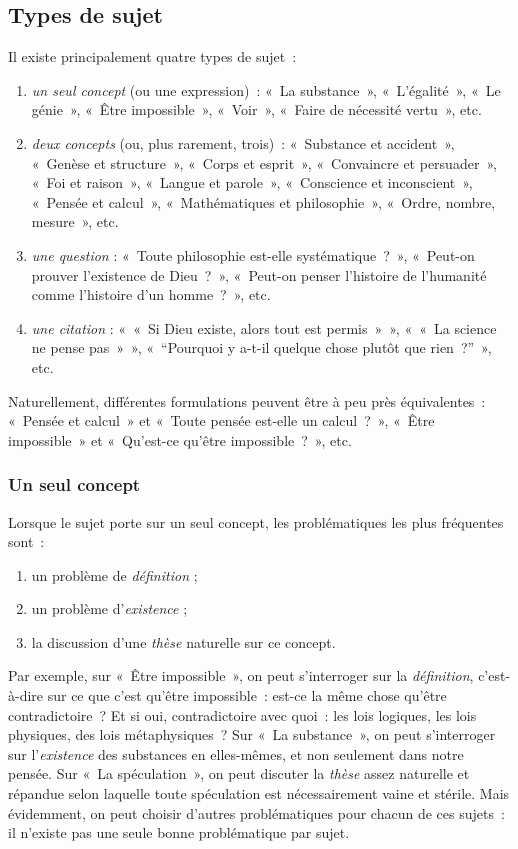 \documentclass[a4paper]{article}
\begin{document}
\subsection{Types de sujet}
\label{sec-2-3}


Il existe principalement quatre types de sujet :

\begin{enumerate}
\item \emph{un seul concept} (ou une expression) : « La substance », « L'égalité »,
   « Le génie », « Être impossible », « Voir », « Faire de nécessité vertu »,
   etc.
\item \emph{deux concepts} (ou, plus rarement, trois) : « Substance et
   accident », « Genèse et structure », « Corps et esprit »,
   « Convaincre et persuader », « Foi et raison », « Langue et parole »,
   « Conscience et inconscient », « Pensée et calcul », « Mathématiques
   et philosophie », « Ordre, nombre, mesure », etc.
\item \emph{une question} : « Toute philosophie est-elle systématique ? »,
   « Peut-on prouver l'existence de Dieu ? », « Peut-on penser l'histoire
   de l'humanité comme l'histoire d'un homme ? », etc.
\item \emph{une citation} : « « Si Dieu existe, alors tout est permis » »,
   « « La science ne pense pas » », « ``Pourquoi y a-t-il quelque chose
   plutôt que rien ?'' », etc.
\end{enumerate}

Naturellement, différentes formulations peuvent être à peu près
équivalentes : « Pensée et calcul » et « Toute pensée est-elle un
calcul ? », « Être impossible » et « Qu'est-ce qu'être impossible ? », etc.
\subsubsection{Un seul concept}
\label{sec-2-3-1}


Lorsque le sujet porte sur un seul concept, les problématiques les plus
fréquentes sont :

\begin{enumerate}
\item un problème de \emph{définition} ;
\item un problème d'\emph{existence} ;
\item la discussion d'une \emph{thèse} naturelle sur ce concept.
\end{enumerate}

Par exemple, sur « Être impossible », on peut s'interroger sur la
\emph{définition}, c'est-à-dire sur ce que c'est qu'être impossible : est-ce
la même chose qu'être contradictoire ? Et si oui, contradictoire avec
quoi : les lois logiques, les lois physiques, des lois métaphysiques ?
Sur « La substance », on peut s'interroger sur l'\emph{existence} des
substances en elles-mêmes, et non seulement dans notre pensée. Sur « La
spéculation », on peut discuter la \emph{thèse} assez naturelle et répandue
selon laquelle toute spéculation est nécessairement vaine et stérile.
Mais évidemment, on peut choisir d'autres problématiques pour chacun de
ces sujets : il n'existe pas une seule bonne problématique par sujet.
\end{document}
